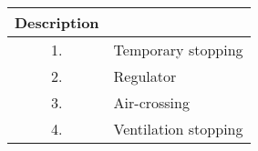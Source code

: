 \begin{tabular}[12pt]{ |c|l| }
  \hline
  \textbf{Description} & \\ \hline
  1. & Temporary stopping \\ \hline
  2. & Regulator \\ \hline
  3. & Air-crossing \\ \hline
  4. & Ventilation stopping \\ \hline
\end{tabular}
